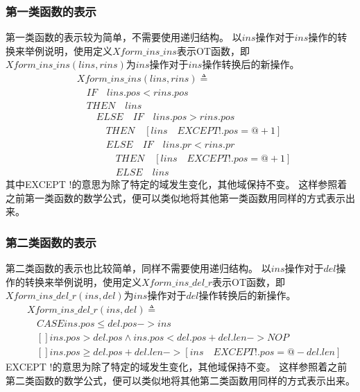 \subsubsection{第一类函数的表示}
第一类函数的表示较为简单，不需要使用递归结构。
以$ins$操作对于$ins$操作的转换来举例说明，使用定义$Xform\_ins\_ins$表示OT函数，即$Xform\_ins\_ins(lins, rins)$为$ins$操作对于$ins$操作转换后的新操作。
\begin{align*}
&Xform\_ins\_ins(lins, rins) \triangleq \\
    &\quad IF \quad lins.pos < rins.pos\\
    &\quad THEN \quad lins\\
    & \quad \quad ELSE \quad IF \quad lins.pos > rins.pos\\
        & \quad \quad \quad THEN \quad [lins \quad EXCEPT !.pos = @ + 1]\\
        & \quad \quad \quad ELSE \quad IF \quad lins.pr < rins.pr\\
                &\quad \quad \quad \quad THEN \quad [lins \quad EXCEPT !.pos = @+1]\\
                &\quad \quad \quad \quad ELSE \quad  lins
\end{align*}
其中EXCEPT !的意思为除了特定的域发生变化，其他域保持不变。
这样参照着之前第一类函数的数学公式，便可以类似地将其他第一类函数用同样的方式表示出来。
\subsubsection{第二类函数的表示}
第二类函数的表示也比较简单，同样不需要使用递归结构。
以$ins$操作对于$del$操作的转换来举例说明，使用定义$Xform\_ins\_del\_r$表示OT函数，即$Xform\_ins\_del\_r(ins, del)$为$ins$操作对于$del$操作转换后的新操作。
\begin{align*}
&Xform\_ins\_del\_r(ins,del) \triangleq \\
   & \quad CASE ins.pos \le del.pos -> ins \\
   & \quad [] ins.pos > del.pos \land ins.pos < del.pos + del.len -> NOP \\
   & \quad [] ins.pos \ge del.pos + del.len -> [ins \quad EXCEPT !.pos = @ - del.len] 
\end{align*}
EXCEPT !的意思为除了特定的域发生变化，其他域保持不变。
这样参照着之前第二类函数的数学公式，便可以类似地将其他第二类函数用同样的方式表示出来。
